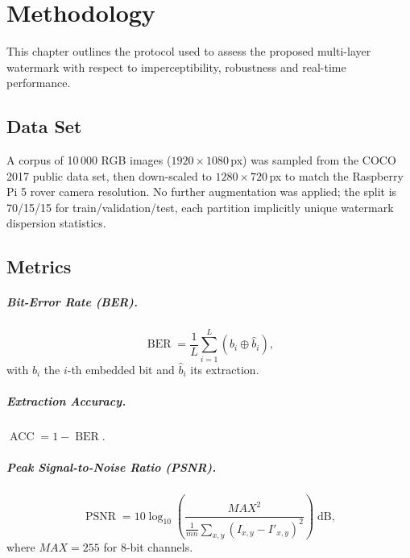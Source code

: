 \chapter{Methodology}
\label{ch:methodology}

This chapter outlines the  protocol used to assess the
proposed multi-layer watermark with respect to imperceptibility,
robustness and real-time performance.

\section{Data Set}
\label{sec:method:dataset}

A corpus of 10\,000 RGB images ($1920\times1080$\,px) was sampled from
the COCO 2017 public data set, then down-scaled to
$1280\times720$\,px to match the Raspberry Pi 5 rover camera resolution.
No further augmentation was applied; the split is 70/15/15 for
train/validation/test, each partition implicitly  unique watermark dispersion statistics.

\section{Metrics}
\label{sec:method:metrics}

\paragraph{Bit-Error Rate (BER).}
\[
    \operatorname{BER}= \frac1L\sum_{i=1}^{L} (b_i \oplus \hat b_i),
\]
with $b_i$ the $i$-th embedded bit and $\hat b_i$ its extraction.

\paragraph{Extraction Accuracy.}  $\operatorname{ACC}=1-\operatorname{BER}$.

\paragraph{Peak Signal-to-Noise Ratio (PSNR).}
\[
    \operatorname{PSNR}=10 \log_{10}\!
    \left(\frac{\mathit{MAX}^2}{\frac1{mn}\sum_{x,y}(I_{x,y}-I'_{x,y})^{2}}\right)
    \;\text{dB},
\]
where $\mathit{MAX}=255$ for 8-bit channels.

